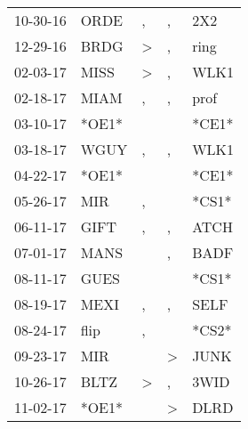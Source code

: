 \begin{supertabular}{p{0.07\textwidth}p{0.06\textwidth}p{0.02\textwidth}p{0.02\textwidth}p{0.06\textwidth}}
 10-30-16\textsuperscript{} &           ORDE\textsuperscript{} &                , &             , &   2X2\textsuperscript{} \\
 12-29-16\textsuperscript{} &           BRDG\textsuperscript{} &     \textgreater &             , &  ring\textsuperscript{} \\
 02-03-17\textsuperscript{} &           MISS\textsuperscript{} &     \textgreater &             , &  WLK1\textsuperscript{} \\
 02-18-17\textsuperscript{} &           MIAM\textsuperscript{} &                , &             , &  prof\textsuperscript{} \\
 03-10-17\textsuperscript{} &                            *OE1* &                  &               &                   *CE1* \\
 03-18-17\textsuperscript{} &           WGUY\textsuperscript{} &                , &             , &  WLK1\textsuperscript{} \\
 04-22-17\textsuperscript{} &                            *OE1* &                  &               &                   *CE1* \\
 05-26-17\textsuperscript{} &            MIR\textsuperscript{} &                , &               &                   *CS1* \\
 06-11-17\textsuperscript{} &           GIFT\textsuperscript{} &                , &             , &  ATCH\textsuperscript{} \\
 07-01-17\textsuperscript{} &           MANS\textsuperscript{} &                  &             , &  BADF\textsuperscript{} \\
 08-11-17\textsuperscript{} &           GUES\textsuperscript{} &                  &               &                   *CS1* \\
 08-19-17\textsuperscript{} &           MEXI\textsuperscript{} &                , &             , &  SELF\textsuperscript{} \\
 08-24-17\textsuperscript{} &           flip\textsuperscript{} &                , &               &                   *CS2* \\
 09-23-17\textsuperscript{} &            MIR\textsuperscript{} &                  &  \textgreater &  JUNK\textsuperscript{} \\
 10-26-17\textsuperscript{} &           BLTZ\textsuperscript{} &     \textgreater &             , &  3WID\textsuperscript{} \\
 11-02-17\textsuperscript{} &                            *OE1* &                  &  \textgreater &  DLRD\textsuperscript{} \\

\end{supertabular}
